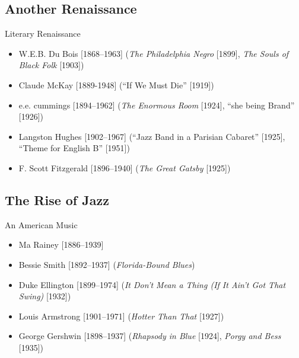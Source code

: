 \subsection{Another Renaissance}
\begin{frame}{Literary Renaissance}
	\begin{itemize}
		\item<+->W.E.B. Du Bois [1868--1963] (\emph{The Philadelphia Negro} [1899], \emph{The Souls of Black Folk} [1903])
		\item<+->Claude McKay [1889-1948] (``If We Must Die'' [1919])
		\item<+->e.e. cummings [1894--1962] (\emph{The Enormous Room} [1924], ``she being Brand'' [1926])
		\item<+->Langston Hughes [1902--1967] (``Jazz Band in a Parisian Cabaret'' [1925], ``Theme for English B'' [1951])
		\item<+->F. Scott Fitzgerald [1896--1940] (\emph{The Great Gatsby} [1925])
	\end{itemize}
\end{frame}

\subsection{The Rise of Jazz}
\begin{frame}{An American Music}
	\begin{itemize}
		\item<+->Ma Rainey [1886--1939]
		\item<+->Bessie Smith [1892--1937] (\emph{Florida-Bound Blues})
		\item<+->Duke Ellington [1899--1974] (\emph{It Don't Mean a Thing (If It Ain't Got That Swing)} [1932])
		\item<+->Louis Armstrong [1901--1971] (\emph{Hotter Than That} [1927])
		\item<+->George Gershwin [1898--1937] (\emph{Rhapsody in Blue} [1924], \emph{Porgy and Bess} [1935])
	\end{itemize}
\end{frame}

